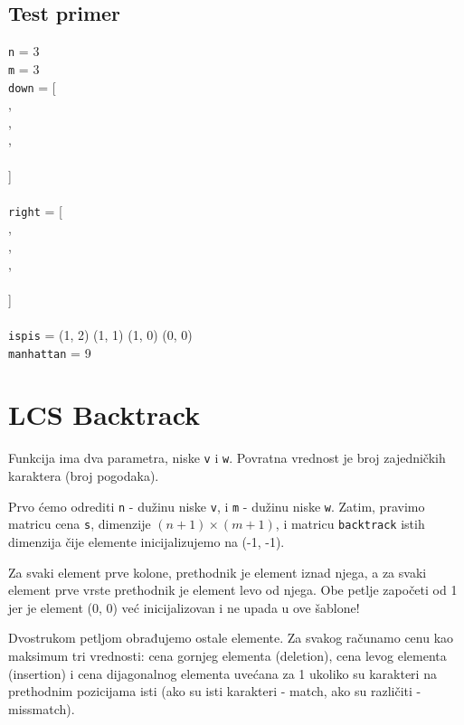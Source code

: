 \subsection{Test primer}

\noindent \texttt{n} = 3
\\\texttt{m} = 3
\\ \noindent\texttt{down} = [
\\\indent[0, 0, 0, 0],
\\\indent[0, 1, 2, 1],
\\\indent[0, 1, 1, 1],
\\\indent[0, 1, 1, 1]
\\]
\\
\\ \texttt{right} = [
\\\indent[0, 0, 0, 1],
\\\indent[0, 3, 5, 1],
\\\indent[0, 1, 0, 1],
\\\indent[0, 1, 0, 1]
\\]
\\
\\\texttt{ispis} = (1, 2) (1, 1) (1, 0) (0, 0)
\\\texttt{manhattan} = 9

\newpage




\section{LCS Backtrack}

Funkcija ima dva parametra, niske \texttt{v} i \texttt{w}. Povratna vrednost je broj zajedničkih karaktera (broj pogodaka).

Prvo ćemo odrediti \texttt{n} - dužinu niske \texttt{v}, i \texttt{m} - dužinu niske \texttt{w}. Zatim, pravimo matricu cena \texttt{s}, dimenzije $(n+1) \times (m+1)$, i matricu \texttt{backtrack} istih dimenzija čije elemente inicijalizujemo na (-1, -1). 

Za svaki element prve kolone, prethodnik je element iznad njega, a za svaki element prve vrste prethodnik je element levo od njega. Obe petlje započeti od 1 jer je element (0, 0) već inicijalizovan i ne upada u ove šablone!

Dvostrukom petljom obrađujemo ostale elemente. Za svakog računamo cenu kao maksimum tri vrednosti: cena gornjeg elementa (deletion), cena levog elementa (insertion) i cena dijagonalnog elementa uvećana za 1 ukoliko su karakteri na prethodnim pozicijama isti (ako su isti karakteri - match, ako su različiti - missmatch). 

